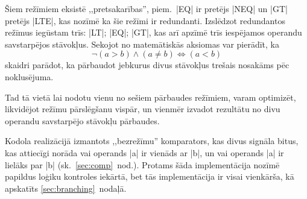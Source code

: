	Šiem režīmiem eksistē ,,pretsakarības'', piem.~|EQ| ir pretējs |NEQ| un
	|GT| pretējs |LTE|, kas nozīmē ka šie režīmi ir redundanti. Izslēdzot
	redundantos režīmus iegūstam trīs: |LT|; |EQ|; |GT|, kas arī apzīmē
	trīs iespējamos operandu savstarpējos stāvokļus.
	Sekojot no matemātiskās aksiomas var pierādīt, ka
	\[
		\neg (a>b) \land (a \neq b) \iff (a<b)
	\]
	skaidri parādot, ka pārbaudot jebkurus divus stāvokļus trešais
	nosakāms pēc noklusējuma.
	\pagebreak[3]
	
	Tad tā vietā lai nodotu vienu no sešiem pārbaudes režīmiem,
	varam optimizēt, likvidējot režīmu pārslēgšanu vispār, un vienmēr izvadot
	rezultātu no divu operandu savstarpējo stāvokļu pārbaudes.
	
	Kodola realizācijā izmantots ,,bezrežīmu'' komparators, kas 
	divus signāla bitus, kas attiecīgi norāda 
	vai operands |a| ir vienāds ar |b|, 
	un vai operands |a| ir lielāks par |b| (sk.~\ref{sec:comp}~nod.).
	Protams šāda implementācija nozīmē papildus loģiku kontroles iekārtā,
	bet tās implementācija ir visai vienkārša, kā apskatīts
	\ref{sec:branching}~nodaļā.

